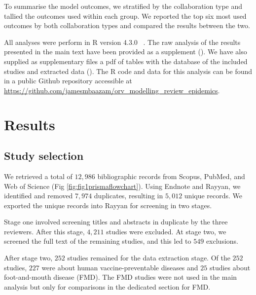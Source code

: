 \documentclass[10pt,letterpaper]{article}
\begin{document}
To summarise the model outcomes, we stratified by the collaboration type and tallied the outcomes used within each group. We reported the top six most used outcomes by both collaboration types and compared the results between the two.

All analyses were perform in R version 4.3.0 ~\cite{R2023}.  The raw analysis of the results presented in the main text have been provided as a supplement (). We have also supplied as supplementary files a pdf of tables with the database of the included studies and extracted data (). The R code and data for this analysis can be found in a public Github repository accessible at \url{https://github.com/jamesmbaazam/orv_modelling_review_epidemics}.


\section*{Results}
\subsection*{Study selection}
We retrieved a total of $12, 986$ bibliographic records from Scopus, PubMed, and Web of Science (Fig \ref{fig:fig1prismaflowchart}). Using Endnote and Rayyan, we identified and removed $7, 974$ duplicates, resulting in $5, 012$ unique records. We exported the unique records into Rayyan for screening in two stages. 


Stage one involved screening titles and abstracts in duplicate by the three reviewers. After this stage, $4, 211$ studies were excluded. At stage two, we screened the full text of the remaining studies, and this led to $549$ exclusions. 

After stage two, $252$ studies remained for the data extraction stage. Of the $252$ studies, $227$ were about human vaccine-preventable diseases and $25$ studies about foot-and-mouth disease (FMD). The FMD studies were not used in the main analysis but only for comparisons in the dedicated section for FMD.
\end{document}
